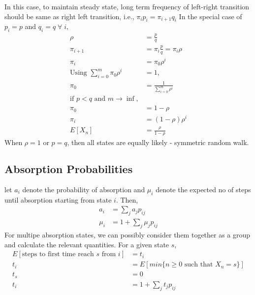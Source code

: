 \documentclass[11pt, a4paper]{article}
\begin{document}
    In this case, to maintain steady state, long term frequency of left-right transition should be same as right left transition, i.e., $\pi_{i}p_{i} = \pi_{i+1}q_{i}$ \newline
    In the special case of $p_{i} = p$ and $q_{i} = q \;\forall\; i$,
    \begin{align*}
        \rho &= \frac{p}{q} \tag*{load factor}\\
        \pi_{i+1} &= \pi_{i} \frac{p}{q} = \pi_{i} \rho \\
        \pi_{i} &= \pi_{0} \rho^{i} \tag*{$i = 0,\ldots,m$} \\
        \text{Using } \sum_{i=0}^{m} \pi_{0}\rho^{i} &= 1,\\
        \pi_{0} &= \frac{1}{\sum_{i=0}^{m} \rho^{i}}\\
        \text{if $p < q$ and $m \rightarrow \inf,$}\\
        \pi_{0} &= 1 - \rho \\
        \pi_{i} &= (1-\rho)\rho^{i}\\
        E[X_{n}] &= \frac{\rho}{1-\rho} \tag*{Exponential Distribution}
    \end{align*}
    When $\rho = 1$ or $p = q$, then all states are equally likely - symmetric random walk.

    \subsection{Absorption Probabilities}
    let $a_{i}$ denote the probability of absorption and $\mu_{i}$ denote the expected no of steps until absorption starting from state $i$. Then,
    \begin{align*}
        a_{i} &= \sum_{j} a_{j}p_{ij} \tag*{outflux to the possible states}\\
        \mu_{i} &= 1 + \sum_{j} \mu_{j} p_{ij}
    \end{align*}
    For multipe absorption states, we can possibly consider them together as a group and calculate the relevant quantities. \newline
    For a given state $s$,
    \begin{align*}
        E[\text{steps to first time reach $s$ from $i$}] &= t_{i} \\
        t_{i} &= E[min \{n \geq 0 \text{ such that } X_{n} = s\}] \\
        t_{s} &= 0 \\
        t_{i} &= 1 + \sum_{j} t_{j}p_{ij} \tag*{outflux to all possible states}
    \end{align*}
\end{document}
